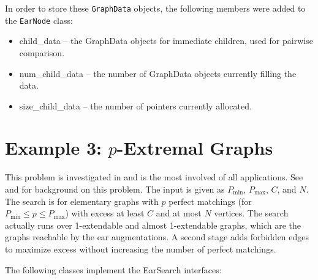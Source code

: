 \documentclass[11pt]{article}
\begin{document}
In order to store these \texttt{GraphData} objects, 
	the following members were added to the \texttt{EarNode}
	class:
	
\begin{itemize}
	
	\item child\_data -- the GraphData objects for immediate children, used for pairwise comparison.
	
	\item num\_child\_data -- the number of GraphData objects currently filling the data.
	\item size\_child\_data -- the number of pointers currently allocated.
\end{itemize}


\section{Example 3: $p$-Extremal Graphs}

This problem is investigated in \cite{pExtremal}
	and is the most involved of all applications.
See \cite{DudekSchmitt} and \cite{HSWY} for background on this problem.
The input is given as $P_{\min}$, $P_{\max}$, $C$, and $N$.
The search is for elementary graphs with $p$ perfect matchings
	(for $P_{\min} \leq p \leq P_{\max}$)
	with excess at least $C$ and at most $N$ vertices.
The search actually runs over 1-extendable and almost 1-extendable graphs,
	which are the graphs reachable by the ear augmentations.
A second stage adds forbidden edges to maximize excess
	without increasing the number of perfect matchings.
	
The following classes implement the EarSearch interfaces:
\end{document}
